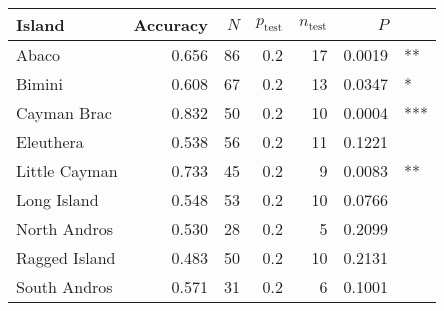 
\begin{tabular}{lrrrrrl}
\toprule
Island & Accuracy & $N$ & $p_{\mbox{test}}$ & $n_{\mbox{test}}$ & $P$ & \\
\midrule
Abaco & 0.656 & 86 & 0.2 & 17 & 0.0019 & **\\
Bimini & 0.608 & 67 & 0.2 & 13 & 0.0347 & *\\
Cayman Brac & 0.832 & 50 & 0.2 & 10 & 0.0004 & ***\\
Eleuthera & 0.538 & 56 & 0.2 & 11 & 0.1221 & \\
Little Cayman & 0.733 & 45 & 0.2 & 9 & 0.0083 & **\\
Long Island & 0.548 & 53 & 0.2 & 10 & 0.0766 & \\
North Andros & 0.530 & 28 & 0.2 & 5 & 0.2099 & \\
Ragged Island & 0.483 & 50 & 0.2 & 10 & 0.2131 & \\
South Andros & 0.571 & 31 & 0.2 & 6 & 0.1001 & \\
\bottomrule
\end{tabular}
